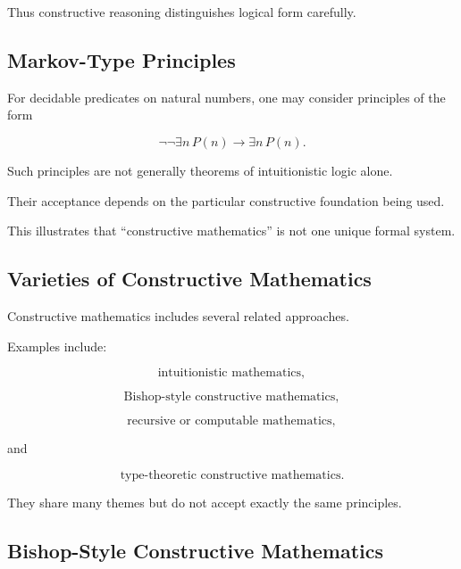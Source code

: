 Thus constructive reasoning distinguishes logical form carefully.

\subsection{Markov-Type Principles}
\label{subsec:markov-principle-preview}

For decidable predicates on natural numbers, one may consider principles of
the form

\[
\boxed{
\neg\neg
\exists n\,P(n)
\rightarrow
\exists n\,P(n).
}
\]

Such principles are not generally theorems of intuitionistic logic alone.

Their acceptance depends on the particular constructive foundation being
used.

This illustrates that ``constructive mathematics'' is not one unique formal
system.

\subsection{Varieties of Constructive Mathematics}
\label{subsec:varieties-constructive-mathematics}

Constructive mathematics includes several related approaches.

Examples include:

\[
\boxed{
\text{intuitionistic mathematics},
}
\]

\[
\boxed{
\text{Bishop-style constructive mathematics},
}
\]

\[
\boxed{
\text{recursive or computable mathematics},
}
\]

and

\[
\boxed{
\text{type-theoretic constructive mathematics}.
}
\]

They share many themes but do not accept exactly the same principles.

\subsection{Bishop-Style Constructive Mathematics}
\label{subsec:bishop-constructive-mathematics}

